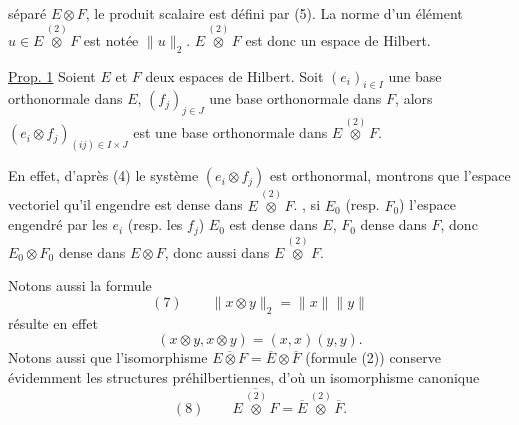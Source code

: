 séparé $E\otimes F$,   le produit scalaire est défini par (5).
La norme d'un élément  $u\in E\overset{(2)}\otimes F$ est notée $\|u\|_2$.
$E\overset{(2)}\otimes F$ est donc un espace de Hilbert.

\uline{Prop. 1} Soient $E$ et $F$ deux espaces de Hilbert. 
Soit $(e_i)_{i\in I}$ une base orthonormale dans $E$, $(f_j)_{j\in J}$ une base orthonormale dans $F$, alors $(e_i\otimes f_j)_{(ij)\in I\times J}$ est une base orthonormale dans $E\overset{(2)}\otimes F$.

En effet, d'après (4) le système $(e_i\otimes f_j)$ est orthonormal, 
 montrons que l'espace vectoriel qu'il engendre est dense dans $E\overset{(2)}\otimes F$.
, si $E_0$ (resp. $F_0$)   l'espace engendré par les $e_i$ (resp. les $f_j$)  
$E_0$ est dense dans $E$, $F_0$ dense dans $F$, donc $E_0\otimes F_0$ dense dans $E\otimes F$, donc aussi dans $E\overset{(2)}\otimes F$.

Notons aussi la formule
\[
(7)\qquad\boxed{\|x\otimes y\|_2=\|x\|\|y\|}
\]
résulte en effet  
\[
(x\otimes y,x\otimes y)=(x,x)(y,y).
\]
Notons aussi que l'isomorphisme  $\overline{E\otimes F}=\overline E\otimes\overline F$ (formule (2)) conserve évidemment les structures préhilbertiennes, d'où un isomorphisme canonique
\[
(8)\qquad\overline{E\overset{(2)}\otimes F}=\overline E\overset{(2)}\otimes\overline F.
\]
